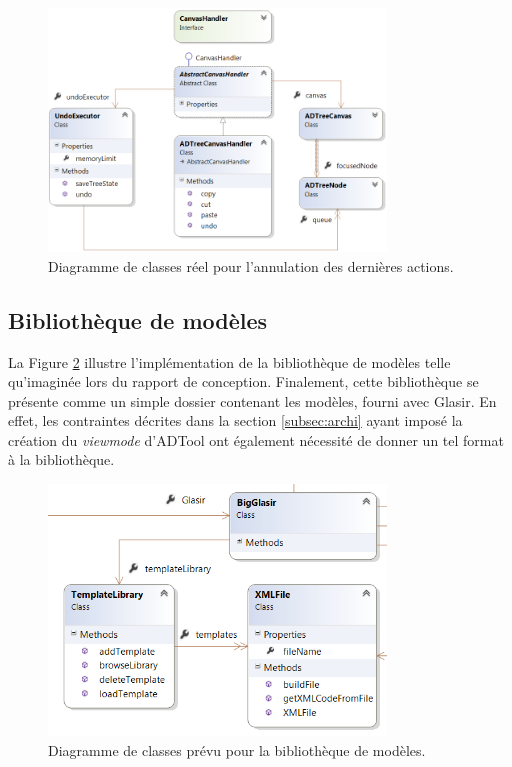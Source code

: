         \begin{figure}
            \centering
                \includegraphics[width=0.8\textwidth]{figure/ctrlzReel.png}
            \caption{Diagramme de classes réel pour l'annulation des dernières actions.}
            \label{fig:ctrlzReel}
        \end{figure}

	\subsection{Bibliothèque de modèles}
		La {\sc Figure} \ref{fig:library} illustre l'implémentation de la bibliothèque de modèles telle qu'imaginée lors du rapport de conception. Finalement, cette bibliothèque se présente comme un simple dossier contenant les modèles, fourni avec Glasir. En effet, les contraintes décrites dans la {\sc section} \ref{subsec:archi} ayant imposé la création du \emph{viewmode} d'ADTool ont également nécessité de donner un tel format à la bibliothèque.
		
		\begin{figure}
            \centering
                \includegraphics[width=0.8\textwidth]{figure/library.png}
            \caption{Diagramme de classes prévu pour la bibliothèque de modèles.}
            \label{fig:library}
        \end{figure}